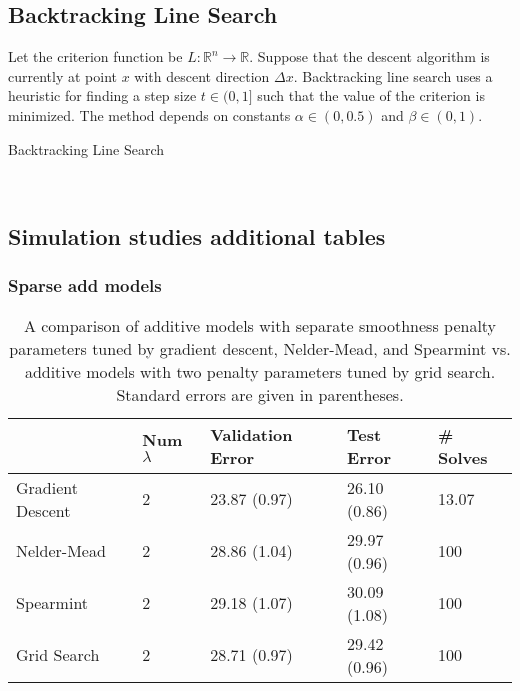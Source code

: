 \documentclass[12pt,letterpaper]{article}
\begin{document}
\subsection{Backtracking Line Search}

Let the criterion function be $L:\mathbb{R}^n \rightarrow \mathbb{R}$. Suppose that the descent algorithm is currently at point $x$ with descent direction $\Delta x$. Backtracking line search uses a heuristic for finding a step size $t \in (0,1]$ such that the value of the criterion is minimized. The method depends on constants $\alpha  \in (0, 0.5)$ and $\beta \in (0,1)$.

\begin{algorithm}
\caption{Backtracking Line Search}
\label{alg:backtracking}
         \begin{algorithmic}
  	 \\
	\ENDWHILE
	\end{algorithmic}
\end{algorithm}

\subsection{Simulation studies additional tables}

\subsubsection{Sparse add models}

\begin{table}
	\caption {\label{tab:additive} A comparison of additive models with separate smoothness penalty parameters tuned by gradient descent, Nelder-Mead, and Spearmint vs. additive models with two penalty parameters tuned by grid search. Standard errors are given in parentheses.}
	\centering
	\begin{tabular}{| l | l | l | l | l | }
		\hline
		& Num $\lambda$ & Validation Error & Test Error & \# Solves\\
		\hline
		Gradient Descent & 2 & 23.87 (0.97) & 26.10 (0.86) & 13.07 \\
		\hline
		Nelder-Mead & 2 & 28.86 (1.04) & 29.97 (0.96) & 100 \\
		\hline
		Spearmint & 2 & 29.18 (1.07) & 30.09 (1.08) & 100 \\
		\hline
		Grid Search & 2 & 28.71 (0.97) & 29.42 (0.96) & 100 \\
		\hline
	\end{tabular}
\end{table}
\end{document}
